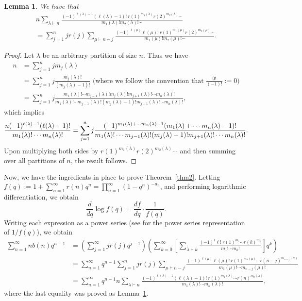 \documentclass[10pt]{article}
\newtheorem{lemma}[theorem]{Lemma}
\theoremstyle{definition}
\numberwithin{theorem}{section}
\numberwithin{equation}{section}
\begin{document}
\begin{lemma} We have that \label{lem}
\begin{multline}
n \sum_{\lambda\vdash n} \frac{ (-1)^{\ell(\lambda)-1} (\ell(\lambda)- 1)!  \ 
r(1)^{m_1(\lambda)} r(2)^{m_2(\lambda)} \cdots  }
{ m_1(\lambda)!  m_2(\lambda)!  \cdots } \\
= \sum_{j=1}^n j r(j) \sum_{\mu\vdash n-j} \frac{ (-1)^{\ell(\mu)} 
\ell(\mu)! \ r(1)^{ m_1(\mu)} r(2)^{ m_2(\mu)} \cdots }
{ m_1(\mu)! m_2(\mu)! \cdots  }.
\end{multline}
\end{lemma}
\begin{proof}
Let $\lambda$ be an arbitrary partition of size $n$.
Thus we have \begin{align*}
  n  &= \sum_{j=1}^n j m_j(\lambda)\\
      & = \sum_{j=1}^n j  \frac{m_j(\lambda)!}{(m_j(\lambda) - 1)!}
      \mbox{  (where we follow the convention that $\frac{0!}{(-1)!} := 0$)}
      \\
      & = \sum_{j=1}^n j \frac
      {m_1(\lambda)! \cdots m_{j-1}(\lambda)! m_j(\lambda)! m_{j+1}(\lambda)! \cdots
       m_n(\lambda)! }
       { m_1(\lambda)! \cdots m_{j-1}(\lambda)! (m_j(\lambda)-1)! m_{j+1}(\lambda)! \cdots
       m_n(\lambda)! } , 
\end{align*}
which implies
\[  \frac{ n(-1)^{\ell(\lambda)-1} (\ell(\lambda) - 1)! }{ m_1(\lambda)! \cdots m_n(\lambda)!}
\\ = \sum_{j=1}^n j
 \frac{ (-1)^{m_1(\lambda) + \cdots m_n(\lambda) - 1} (m_1(\lambda) + \cdots m_n(\lambda)-1)!  } { m_1(\lambda)! \cdots m_{j-1}(\lambda)! (m_j(\lambda)-1)! m_{j+1}(\lambda)! \cdots
       m_n(\lambda)!   }.
 \]
Upon multiplying both sides by $r(1)^{m_1(\lambda)}  r(2)^{m_2(\lambda)}  \cdots $
and then summing over all partitions of $n$, the result follows.
\end{proof}

Now, we have the ingredients in place to prove Theorem~\ref{thm2}. Letting $f(q) := 1 + \sum_{n=1}^\infty r(n) q^n = \prod_{n=1}^\infty (1-q^n)^{-a_n}$,
and performing logarithmic differentiation, we obtain
\[    \frac{d}{dq} \log f(q) = \frac{df}{dq} \cdot \frac{1}{f(q)}. \]
Writing each expression as a power series (see \cite[p. 3, Lemma 1]{ss22} for
the power series representation of $1/f(q)$), we obtain
\begin{align*}
\sum_{n=1}^\infty nb(n)q^{n-1} &=
 \left( \sum_{j=1}^\infty j r(j) q^{j-1} \right)
 \left(\sum_{k=0}^\infty \left[ \sum_{\lambda\vdash k }
 \frac{(-1)^\ell \ell!\ r(1)^{m_1} \cdots r(k)^{m_k}}{m_1! \cdots m_k!} \right] q^k \right)\\
 &= 
 \sum_{n=1}^\infty q^{n-1}
 \sum_{j=1}^n j r(j) \sum_{\mu\vdash n-j} \frac{ (-1)^{\ell(\mu)} 
\ell(\mu)! \ r(1)^{ m_1(\mu)} \cdots r(n-j)^{m_{n-j}(\mu)} }
{ m_1(\mu)! \cdots m_{n-j}(\mu)! }\\
&= \sum_{n=1}^\infty q^{n-1} n \sum_{\lambda\vdash n} \frac{ (-1)^{\ell(\lambda)-1} (\ell(\lambda) - 1)!  \ 
r(1)^{m_1(\lambda)} \cdots r(n)^{m_n(\lambda)} }
{ m_1(\lambda)! \cdots m_n(\lambda)! },
\end{align*}
where the last equality was proved as Lemma~\ref{lem}.
\end{document}
